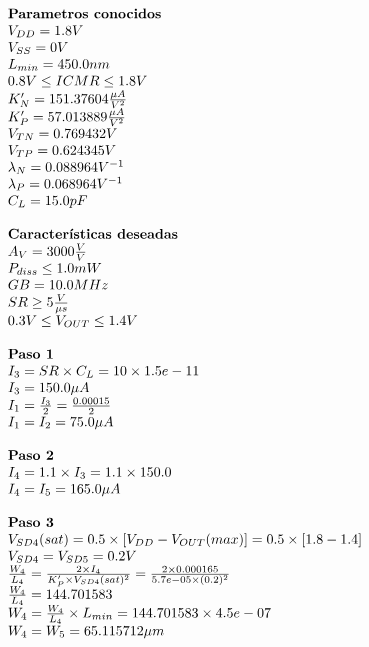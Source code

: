 \begin{equation*}
	\begin{array}{l l}
		\textbf{Parametros conocidos} \\
		V_{DD} =  1.8  V \\
		V_{SS} =  0  V \\
		L_{min} =  450.0  nm \\
		0.8 V \leq ICMR \leq 1.8 V \\
		K'_{N} =  151.37604  \frac{\mu A}{V^{2}} \\
		K'_{P} =  57.013889  \frac{\mu A}{V^{2}} \\
		V_{TN} =  0.769432  V \\
		V_{TP} =  0.624345  V \\
		\lambda_{N} =  0.088964  V^{-1} \\
		\lambda_{P} =  0.068964  V^{-1} \\
		C_{L} =  15.0  pF \\
		\\
		\textbf{Características deseadas} \\
		A_{V} =  3000  \frac{V}{V} \\
		P_{diss} \leq  1.0  mW \\
		GB =  10.0  MHz \\
		SR \geq  5  \frac{V}{\mu s} \\
		0.3 V \leq V_{OUT} \leq 1.4 V \\
		\\
		\textbf{Paso 1} \\
		I_{3} = SR \times C_{L} = 10\times1.5e-11 \\
		I_{3} =  150.0 \mu A \\
		I_{1} = \frac{I_{3}}{2} = \frac{ 0.00015 }{2} \\
		I_{1} = I_{2} =  75.0 \mu A \\
		\\
		\textbf{Paso 2} \\
		I_{4} = 1.1 \times I_{3} = 1.1 \times 150.0  \\
		I_{4} = I_{5} =  165.0 \mu A \\
		\\
		\textbf{Paso 3} \\
		V_{SD4}(sat) = 0.5 \times \left[ V_{DD} - V_{OUT}(max) \right] = 0.5 \times \left[  1.8  -  1.4  \right] \\
		V_{SD4} = V_{SD5} =  0.2  V \\
		\frac{W_4}{L_4} = \frac{2\times I_{4}}{K'_{P}\times V_{SD4}(sat)^2} = \frac{2\times 0.000165 }{ 5.7e-05 \times ( 0.2 )^2} \\
		\frac{W_4}{L_4} =  144.701583  \\
		W_{4} = \frac{W_4}{L_4} \times L_{min} =  144.701583 \times 4.5e-07  \\
		W_{4} = W_{5} =  65.115712  \mu m \\
	\end{array}
\end{equation*}

